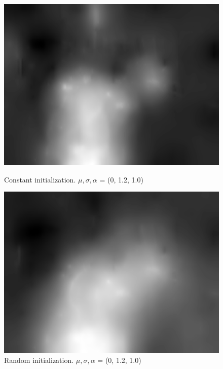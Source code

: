 \documentclass[11pt]{article} %
\begin{document}
  \begin{figure}[ht]
  \centering
  \begin{minipage}[b]{0.45\textwidth}
    \includegraphics[width=\textwidth]{output3.png}
    \caption{Constant initialization. $\mu, \sigma, \alpha$ = (0, 1.2, 1.0)}
    \label{fig:image1}
  \end{minipage}
  \hfill
  \begin{minipage}[b]{0.45\textwidth}
    \includegraphics[width=\textwidth]{output4.png}
    \caption{Random initialization. $\mu, \sigma, \alpha$ = (0, 1.2, 1.0)}
    \label{fig:image2}
  \end{minipage}
  \end{figure}
\end{document}

